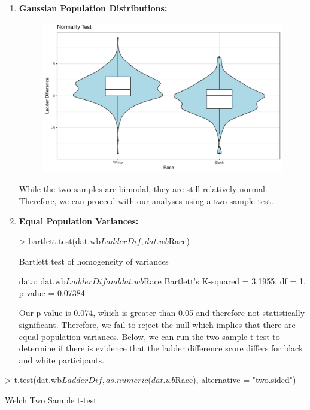 \documentclass{article}
\begin{document}
\begin{enumerate}
\begin{enumerate}
\item \textbf{Gaussian Population Distributions:} 
\begin{figure}[H]
\includegraphics{finalExam-028}
\end{figure}
While the two samples are bimodal, they are still relatively normal. Therefore, we can proceed with our analyses using a two-sample test. 
\item \textbf{Equal Population Variances:}
\begin{Schunk}
\begin{Sinput}
> bartlett.test(dat.wb$LadderDif, dat.wb$Race)
\end{Sinput}
\begin{Soutput}
	Bartlett test of homogeneity of variances

data:  dat.wb$LadderDif and dat.wb$Race
Bartlett's K-squared = 3.1955, df = 1, p-value = 0.07384
\end{Soutput}
\end{Schunk}
Our p-value is 0.074, which is greater than 0.05 and therefore not statistically significant. Therefore, we fail to reject the null which implies that there are equal population variances. 
Below, we can run the two-sample t-test to determine if there is evidence that the ladder difference score differs for black and white participants.
\end{enumerate}

\begin{Schunk}
\begin{Sinput}
> t.test(dat.wb$LadderDif, as.numeric(dat.wb$Race), alternative = "two.sided")
\end{Sinput}
\begin{Soutput}
	Welch Two Sample t-test


\end{Soutput}
\end{Schunk}
\end{enumerate}
\end{document}
